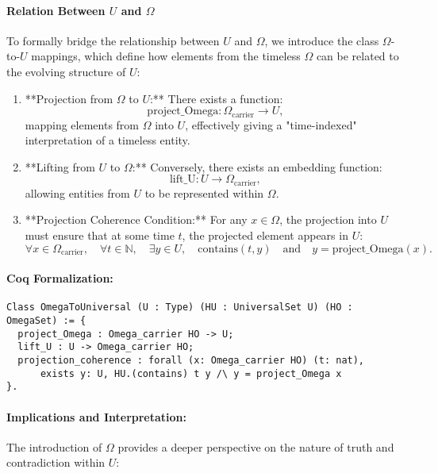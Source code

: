 \documentclass[12pt]{article}
\begin{document}
\paragraph{Relation Between \( U \) and \( \Omega \)}
To formally bridge the relationship between \( U \) and \( \Omega \), we introduce the class \( \Omega \)-to-\( U \) mappings, which define how elements from the timeless \( \Omega \) can be related to the evolving structure of \( U \):

\begin{enumerate}
    \item **Projection from \( \Omega \) to \( U \):** There exists a function:
    \[
    \text{project\_Omega}: \Omega_{\text{carrier}} \to U,
    \]
    mapping elements from \( \Omega \) into \( U \), effectively giving a "time-indexed" interpretation of a timeless entity.
    \item **Lifting from \( U \) to \( \Omega \):** Conversely, there exists an embedding function:
    \[
    \text{lift\_U}: U \to \Omega_{\text{carrier}},
    \]
    allowing entities from \( U \) to be represented within \( \Omega \).
    \item **Projection Coherence Condition:** For any \( x \in \Omega \), the projection into \( U \) must ensure that at some time \( t \), the projected element appears in \( U \):
    \begin{equation}
        \forall x \in \Omega_{\text{carrier}}, \quad \forall t \in \mathbb{N}, \quad
        \exists y \in U, \quad \text{contains}(t, y) \quad \text{and} \quad y = \text{project\_Omega}(x).
    \end{equation}
\end{enumerate}

\paragraph{Coq Formalization:}
\begin{lstlisting}[language=Coq]
Class OmegaToUniversal (U : Type) (HU : UniversalSet U) (HO : OmegaSet) := {
  project_Omega : Omega_carrier HO -> U;
  lift_U : U -> Omega_carrier HO;
  projection_coherence : forall (x: Omega_carrier HO) (t: nat),
      exists y: U, HU.(contains) t y /\ y = project_Omega x
}.
\end{lstlisting}

\paragraph{Implications and Interpretation:}
The introduction of \( \Omega \) provides a deeper perspective on the nature of truth and contradiction within \( U \):
\end{document}
